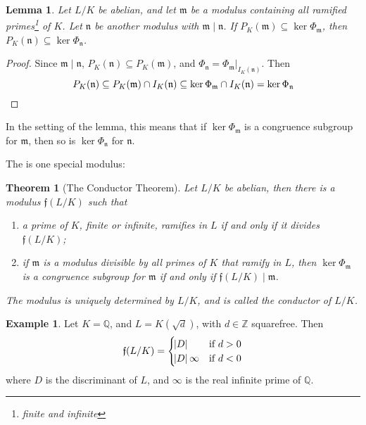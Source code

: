 \documentclass[11pt]{article}
\theoremstyle{definition}
\newtheorem{example}[definition]{Example}
\theoremstyle{plain}
\newtheorem{theorem}[definition]{Theorem}
\newtheorem{lemma}[definition]{Lemma}
\theoremstyle{remark}
\newcommand{\ZZ}{\mathbb{Z}}
\newcommand{\QQ}{\mathbb{Q}}
\newcommand{\ff}{\mathfrak{f}}
\newcommand{\fm}{\mathfrak{m}}
\newcommand{\fn}{\mathfrak{n}}
\begin{document}
\begin{lemma}\label{lem:3_1}
    Let $L/K$ be abelian, and let $\fm$ be a modulus containing all ramified primes\footnote{finite and infinite} of $K$. Let $\fn$ be another modulus with $\fm \mid \fn$. If $P_K(\fm) \subseteq \ker \Phi_\fm$, then $P_K(\fn) \subseteq \ker \Phi_\fn$.
\end{lemma}
\begin{proof}
    Since $\fm \mid \fn$, $P_K(\fn) \subseteq P_K(\fm)$, and $\Phi_\fn = \Phi_\fm \vert_{I_K(\fn)}$. Then
    \begin{equation*}
        P_K(\fn) \subseteq P_K(\fm) \cap I_K(\fn) \subseteq \ker \Phi_\fm \cap I_K(\fn) = \ker \Phi_\fn \qedhere
    \end{equation*}
\end{proof}

\noindent In the setting of the lemma, this means that if $\ker \Phi_\fm$ is a congruence subgroup for $\fm$, then so is $\ker \Phi_\fn$ for $\fn$.

The is one special modulus:

\begin{theorem}[The Conductor Theorem]\label{thm:3_2}
    Let $L/K$ be abelian, then there is a modulus $\ff(L/K)$ such that
    \begin{enumerate}
        \item a prime of $K$, finite or infinite, ramifies in $L$ if and only if it divides $\ff(L/K)$;
        \item if $\fm$ is a modulus divisible by all primes of $K$ that ramify in $L$, then $\ker \Phi_\fm$ is a congruence subgroup for $\fm$ if and only if $\ff(L/K) \mid \fm$.
    \end{enumerate}
    The modulus is uniquely determined by $L/K$, and is called the \emph{conductor} of $L/K$.
\end{theorem}

\begin{example}\label{eg:3_3}
    Let $K = \QQ$, and $L = K(\sqrt{d})$, with $d \in \ZZ$ squarefree. Then
    \begin{equation*}
        \ff(L/K) =
        \begin{cases}
            \abs{D} & \text{if } d>0\\
            \abs{D}\infty & \text{if } d<0
        \end{cases}
    \end{equation*}
    where $D$ is the discriminant of $L$, and $\infty$ is the real infinite prime of $\QQ$.
\end{example}
\end{document}
